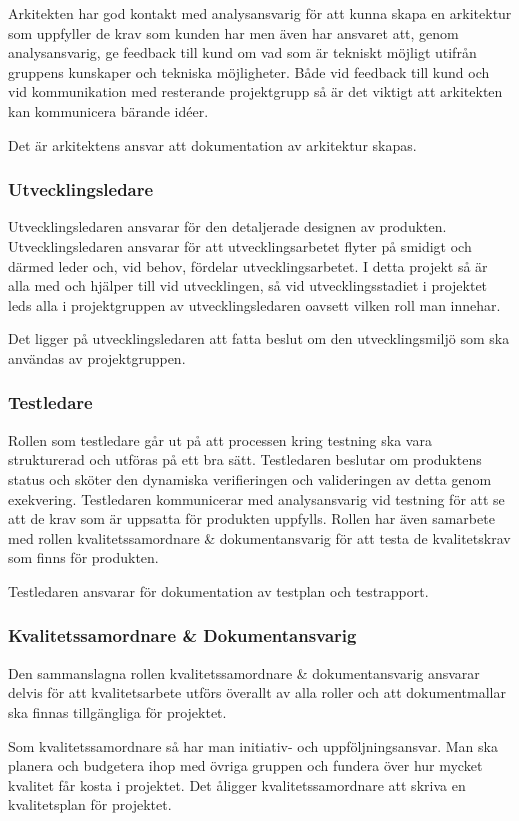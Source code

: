 \documentclass[a4paper,10pt]{article}
\begin{document}
Arkitekten har god kontakt med analysansvarig för att kunna skapa en arkitektur som uppfyller de krav som kunden har men även har ansvaret att, genom analysansvarig, ge feedback till kund om vad som är tekniskt möjligt utifrån gruppens kunskaper och tekniska möjligheter. Både vid feedback till kund och vid kommunikation med resterande projektgrupp så är det viktigt att arkitekten kan kommunicera bärande idéer.

Det är arkitektens ansvar att dokumentation av arkitektur skapas.
\subsubsection{Utvecklingsledare}
Utvecklingsledaren ansvarar för den detaljerade designen av produkten. Utvecklingsledaren ansvarar för att utvecklingsarbetet flyter på smidigt och därmed leder och, vid behov, fördelar utvecklingsarbetet. I detta projekt så är alla med och hjälper till vid utvecklingen, så vid utvecklingsstadiet i projektet leds alla i projektgruppen av utvecklingsledaren oavsett vilken roll man innehar.

Det ligger på utvecklingsledaren att fatta beslut om den utvecklingsmiljö som ska användas av projektgruppen.
\subsubsection{Testledare}
Rollen som testledare går ut på att processen kring testning ska vara strukturerad och utföras på ett bra sätt. Testledaren beslutar om produktens status och sköter den dynamiska verifieringen och valideringen av detta genom exekvering. Testledaren kommunicerar med analysansvarig vid testning för att se att de krav som är uppsatta för produkten uppfylls. Rollen har även samarbete med rollen kvalitetssamordnare \& dokumentansvarig för att testa de kvalitetskrav som finns för produkten.

Testledaren ansvarar för dokumentation av testplan och testrapport.
\subsubsection{Kvalitetssamordnare \& Dokumentansvarig}
Den sammanslagna rollen kvalitetssamordnare \& dokumentansvarig ansvarar delvis för att kvalitetsarbete utförs överallt av alla roller och att dokumentmallar ska finnas tillgängliga för projektet.

Som kvalitetssamordnare så har man initiativ- och uppföljningsansvar. Man ska planera och budgetera ihop med övriga gruppen och fundera över hur mycket kvalitet får kosta i projektet. Det åligger kvalitetssamordnare att skriva en kvalitetsplan för projektet.
\end{document}
